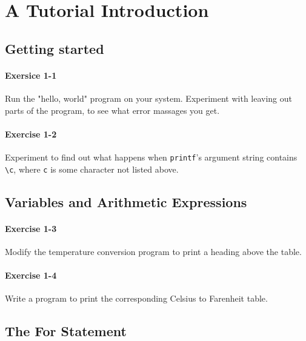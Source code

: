 \section{A Tutorial Introduction}
	\subsection{Getting started}
		\paragraph{Exersice 1-1}
			Run the "hello, world" program on your system. Experiment with leaving
			out parts of the program, to see what error massages you get.

			\hfill{}\cite[p.~8]{knr}
			

		\paragraph{Exercise 1-2}
			Experiment to find out what happens when \lstinline{printf}'s argument
			string contains \lstinline{\c}, where \lstinline{c} is some character
			not listed above.

			\hfill{}\cite[p.~8]{knr}
			

	\subsection{Variables and Arithmetic Expressions}
		\paragraph{Exercise 1-3}
			Modify the temperature conversion program to print a heading above the
			table.

			\hfill{}\cite[p.~13]{knr}
			

		\paragraph{Exercise 1-4}
			Write a program to print the corresponding Celsius to Farenheit table.

			\hfill{}\cite[p.~13]{knr}
			

	\subsection{The For Statement}

